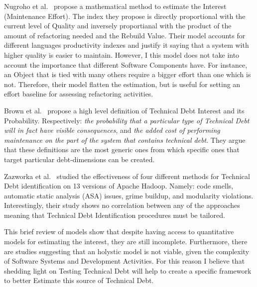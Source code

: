 Nugroho et al.\ \cite{technicalDebtInterest} propose a mathematical method to estimate the Interest (Maintenance Effort). The index they propose is directly proportional with the current level of Quality and inversely proportianal with the product of the amount of refactoring needed and the Rebuild Value. Their model accounts for different languages productivity indexes and justify it saying that a system with higher quality is easier to maintain. However, I this model does not take into account the importance that different Software Components have. For instance, an Object that is tied with many others require a bigger effort than one which is not. Therefore, their model flatten the estimation, but is useful for setting an effort baseline for assessing refactoring activities.

Brown et al.\ \cite{td_current_vs_optimal_quality} propose a high level definition of Technical Debt Interest and its Probability. Respectively: \textit{the probability that a particular type of Technical Debt will in fact have visible consequences}, and \textit{the added cost of performing maintenance
on the part of the system that contains technical debt}. They argue that these definitions are the most generic ones from which specific ones that target particular debt-dimensions can be created.

Zazworka et al.\ \cite{4_methods_to_identify_td} studied the effectiveness of four different methods for Technical Debt identification on 13 versions of Apache Hadoop. Namely: code smells, automatic static analysis (ASA) issues, grime
buildup, and modularity violations. Interestingly, their study shows no correlation between any of the approaches meaning that Technical Debt Identification procedures must be tailored.

This brief review of models show that despite having access to quantitative models for estimating the interest, they are still incomplete. Furthermore, there are studies suggesting that an holystic model is not viable, given the complexity of Software Systems and Development Activities. For this reason I believe that shedding light on Testing Technical Debt will help to create a specific framework to better Estimate this source of Technical Debt.
